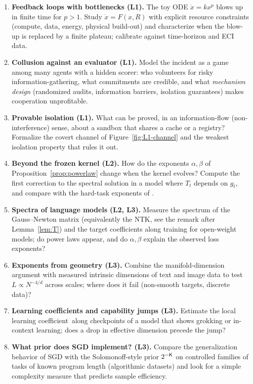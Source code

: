 \begin{enumerate}
  \item \textbf{Feedback loops with bottlenecks (L1).} The toy ODE $\dot x=kx^p$ blows up in finite time for $p>1$. Study $\dot x=F(x,R)$ with explicit resource constraints (compute, data, energy, physical build-out) and characterize when the blow-up is replaced by a finite plateau; calibrate against time-horizon and ECI data.
  \item \textbf{Collusion against an evaluator (L1).} Model the incident as a game among many agents with a hidden scorer: who volunteers for risky information-gathering, what commitments are credible, and what \emph{mechanism design} (randomized audits, information barriers, isolation guarantees) makes cooperation unprofitable.
  \item \textbf{Provable isolation (L1).} What can be proved, in an information-flow (non-interference) sense, about a sandbox that shares a cache or a registry? Formalize the covert channel of Figure~\ref{fig:L1-channel} and the weakest isolation property that rules it out.
  \item \textbf{Beyond the frozen kernel (L2).} How do the exponents $\alpha,\beta$ of Proposition~\ref{prop:powerlaw} change when the kernel evolves? Compute the first correction to the spectral solution in a model where $T_t$ depends on $g_t$, and compare with the hard-task exponents of \citet{bordelon2025}.
  \item \textbf{Spectra of language models (L2, L3).} Measure the spectrum of the Gauss--Newton matrix (equivalently the NTK, see the remark after Lemma~\ref{lem:T}) and the target coefficients along training for open-weight models; do power laws appear, and do $\alpha,\beta$ explain the observed loss exponents?
  \item \textbf{Exponents from geometry (L3).} Combine the manifold-dimension argument with measured intrinsic dimensions of text and image data to test $L\propto N^{-4/d}$ across scales; where does it fail (non-smooth targets, discrete data)?
  \item \textbf{Learning coefficients and capability jumps (L3).} Estimate the local learning coefficient\,\citep{lau2023} along checkpoints of a model that shows grokking or in-context learning; does a drop in effective dimension precede the jump?
  \item \textbf{What prior does SGD implement? (L3).} Compare the generalization behavior of SGD with the Solomonoff-style prior $2^{-\mathsf{K}}$ on controlled families of tasks of known program length (algorithmic datasets) and look for a simple complexity measure that predicts sample efficiency.

\end{enumerate}
